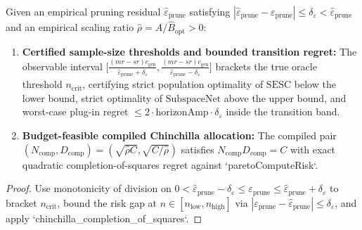 \begin{lemma}\label{lem:zero_shot_compiler}
\leanok
{}
Given an empirical pruning residual $\hat{\varepsilon}_{\mathrm{prune}}$ satisfying $|\hat{\varepsilon}_{\mathrm{prune}} - \varepsilon_{\mathrm{prune}}| \le \delta_\varepsilon < \hat{\varepsilon}_{\mathrm{prune}}$ and an empirical scaling ratio $\hat{\rho} = \hat{A}/\hat{B}_{\mathrm{opt}} > 0$:
\begin{enumerate}
\item \textbf{Certified sample-size thresholds and bounded transition regret:} The observable interval $\bigl[\frac{(mr-sr)c_{\mathrm{gen}}}{\hat{\varepsilon}_{\mathrm{prune}}+\delta_\varepsilon}, \frac{(mr-sr)c_{\mathrm{gen}}}{\hat{\varepsilon}_{\mathrm{prune}}-\delta_\varepsilon}\bigr]$ brackets the true oracle threshold $n_{\mathrm{crit}}$, certifying strict population optimality of $\mathrm{SESC}$ below the lower bound, strict optimality of $\mathrm{SubspaceNet}$ above the upper bound, and worst-case plug-in regret $\le 2\cdot\mathrm{horizonAmp}\cdot\delta_\varepsilon$ inside the transition band.
\item \textbf{Budget-feasible compiled Chinchilla allocation:} The compiled pair $(N_{\mathrm{comp}}, D_{\mathrm{comp}}) = (\sqrt{\hat{\rho}C}, \sqrt{C/\hat{\rho}})$ satisfies $N_{\mathrm{comp}}D_{\mathrm{comp}} = C$ with exact quadratic completion-of-squares regret against `paretoComputeRisk`.
\end{enumerate}
\end{lemma}
\begin{proof}
\leanok
Use monotonicity of division on $0 < \hat{\varepsilon}_{\mathrm{prune}} - \delta_\varepsilon \le \varepsilon_{\mathrm{prune}} \le \hat{\varepsilon}_{\mathrm{prune}} + \delta_\varepsilon$ to bracket $n_{\mathrm{crit}}$, bound the risk gap at $n \in [n_{\mathrm{low}}, n_{\mathrm{high}}]$ via $|\varepsilon_{\mathrm{prune}} - \hat{\varepsilon}_{\mathrm{prune}}| \le \delta_\varepsilon$, and apply `chinchilla_completion_of_squares`.
\end{proof}

